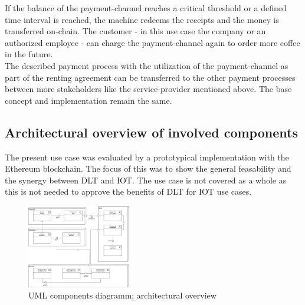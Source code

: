 \documentclass[conference]{IEEEtran}
\begin{document}
If the balance of the payment-channel reaches a critical threshold or a defined time interval is reached, the machine redeems the receipts and the money is transferred on-chain. The customer - in this use case the company or an authorized employee - can charge the payment-channel again to order more coffee in the future.\\
The described payment process with the utilization of the payment-channel as part of the renting agreement can be transferred to the other payment processes between more stakeholders like the service-provider mentioned above. The base concept and implementation remain the same.

\subsection{Architectural overview of involved components}
The present use case was evaluated by a prototypical implementation with the Ethereum blockchain. The focus of this was to show the general feasability and the synergy between DLT and IOT. The use case is not covered as a whole as this is not needed to approve the benefits of DLT for IOT use cases.\\

\begin{figure}[htbp]
 \centering
 \includegraphics[width=0.4\textwidth]{media/Architecture.png}
 \caption{UML components diagramm; architectural overview}
 \label{fig:architecture}
\end{figure}
\end{document}
